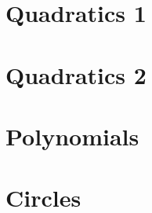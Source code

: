 \documentclass[12pt]{article}
\begin{document}
				
				\newpage
				

				
				\newpage
				

				
				\newpage
				

				
				\newpage
				

			\newpage
			\section{Quadratics 1}

			
				\newpage
				

				
				\newpage
				

				
				\newpage
				

				
				\newpage
				

				
				\newpage
				

			\newpage
			\section{Quadratics 2}

				\newpage
				

				
				\newpage
				

				
				\newpage
				

				
				\newpage
				

				
				\newpage
				

			\newpage
			\section{Polynomials}

			
				\newpage
				

				
				\newpage
				

				
				\newpage
				

				
				\newpage
				

				
				\newpage
				
			
			\newpage
			\section{Circles}
\end{document}
